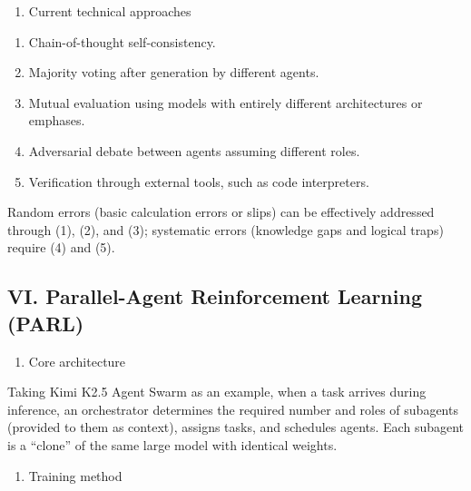 \begin{enumerate}
\def\labelenumi{\arabic{enumi}.}
\setcounter{enumi}{2}
\tightlist
\item
  Current technical approaches
\end{enumerate}

\begin{enumerate}
\def\labelenumi{(\arabic{enumi})}
\item
  Chain-of-thought self-consistency.
\item
  Majority voting after generation by different agents.
\item
  Mutual evaluation using models with entirely different architectures or emphases.
\item
  Adversarial debate between agents assuming different roles.
\item
  Verification through external tools, such as code interpreters.
\end{enumerate}

Random errors (basic calculation errors or slips) can be effectively addressed through (1), (2), and (3); systematic errors (knowledge gaps and logical traps) require (4) and (5).

\hypertarget{vi.-parallel-agent-reinforcement-learning-parl}{%
\subsection{VI. Parallel-Agent Reinforcement Learning (PARL)}\label{vi.-parallel-agent-reinforcement-learning-parl}}

\begin{enumerate}
\def\labelenumi{\arabic{enumi}.}
\tightlist
\item
  Core architecture
\end{enumerate}

Taking Kimi K2.5 Agent Swarm as an example, when a task arrives during inference, an orchestrator determines the required number and roles of subagents (provided to them as context), assigns tasks, and schedules agents. Each subagent is a ``clone'' of the same large model with identical weights.

\begin{enumerate}
\def\labelenumi{\arabic{enumi}.}
\setcounter{enumi}{1}
\tightlist
\item
  Training method
\end{enumerate}

